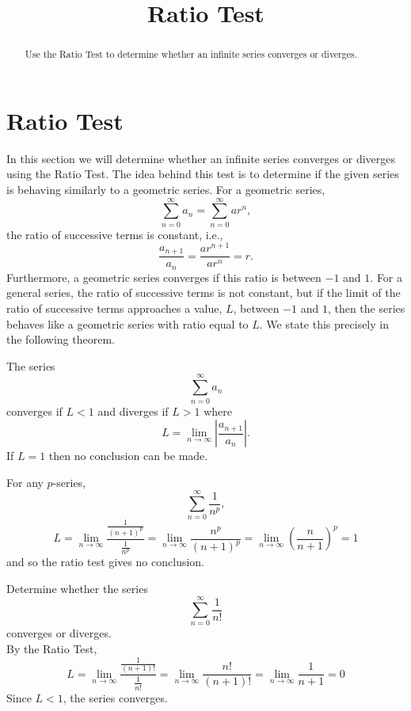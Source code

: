 \documentclass{ximera}
\title{Ratio Test}
\begin{document}
\begin{abstract}
Use the Ratio Test to determine whether an infinite series converges or diverges.
\end{abstract}

\maketitle

\section{Ratio Test}

In this section we will determine whether an infinite series converges or diverges using the Ratio Test. 
The idea behind this test is to determine if the given series is behaving similarly to a geometric series.
For a geometric series, 
\[
\sum_{n=0}^\infty a_n = \sum_{n=0}^\infty ar^n,
\]
the ratio of successive terms is constant, i.e., 
\[
\frac{a_{n+1}}{a_n} = \frac{ar^{n+1}}{ar^n} = r.
\]
Furthermore, a geometric series converges if this ratio is between $-1$ and $1$.
For a general series, the ratio of successive terms is not constant, but if the limit of the ratio of successive terms
approaches a value, $L$, between $-1$ and $1$, then the series behaves like a geometric series with ratio equal to $L$.
We state this precisely in the following theorem.

\begin{theorem}
The series
\[
\sum_{n=0}^\infty a_n
\]
converges if $L < 1$ and diverges if $L>1$ where 
\[
L = \lim_{n \to \infty} |\frac{a_{n+1}}{a_n}|.
\]
If $L = 1$ then no conclusion can be made.

\end{theorem}
 
\begin{remark}
For any $p$-series,
\[
\sum_{n=0}^\infty \frac{1}{n^p},
\]
\[
L =  \lim_{n \to \infty} \frac{\frac{1}{(n+1)^p}}{\frac{1}{n^p}} = \lim_{n \to \infty} \frac{n^p}{(n+1)^p} =  \lim_{n \to \infty} \left(\frac{n}{n+1}\right)^p = 1
\]
and so the ratio test gives no conclusion.
\end{remark}

\begin{example}
Determine whether the series
\[
\sum_{n=0}^\infty \frac{1}{n!}
\]
converges or diverges.\\
By the Ratio Test,
\[
L =  \lim_{n \to \infty} \frac{\frac{1}{(n+1)!}}{\frac{1}{n!}} =  \lim_{n \to \infty} \frac{n!}{(n+1)!} =  \lim_{n \to \infty} \frac{1}{n+1} = 0
\]
Since $L < 1$, the series converges.
\end{example}
\end{document}
